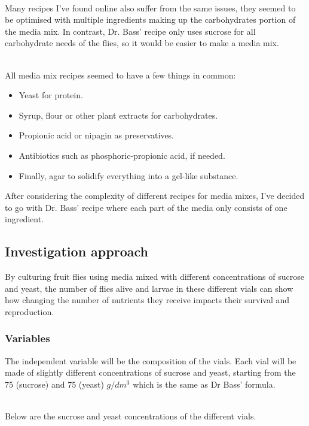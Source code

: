\documentclass{article}
\begin{document}
\noindent\\
Many recipes I've found online also suffer from the same issues, they seemed to be optimised with multiple ingredients making up the carbohydrates portion of the media mix. In contrast, Dr. Bass' recipe only uses sucrose for all carbohydrate needs of the flies, so it would be easier to make a media mix.

\noindent\\
All media mix recipes seemed to have a few things in common:

\begin{itemize}
    \item Yeast for protein.
    \item Syrup, flour or other plant extracts for carbohydrates.
    \item Propionic acid or nipagin as preservatives.
    \item Antibiotics such as phosphoric-propionic acid, if needed\cite{diet}.
    \item Finally, agar to solidify everything into a gel-like substance.
\end{itemize}

\noindent
After considering the complexity of different recipes for media mixes, I've decided to go with Dr. Bass' recipe where each part of the media only consists of one ingredient.


\subsection{Investigation approach}

By culturing fruit flies using media mixed with different concentrations of sucrose and yeast, the number of flies alive and larvae in these different vials can show how changing the number of nutrients they receive impacts their survival and reproduction.

\subsubsection{Variables}

The independent variable will be the composition of the vials. Each vial will be made of slightly different concentrations of sucrose and yeast, starting from the 75 (sucrose) and 75 (yeast) $g/dm^3$ which is the same as Dr Bass' formula.

\noindent\\
Below are the sucrose and yeast concentrations of the different vials.\\
\end{document}
